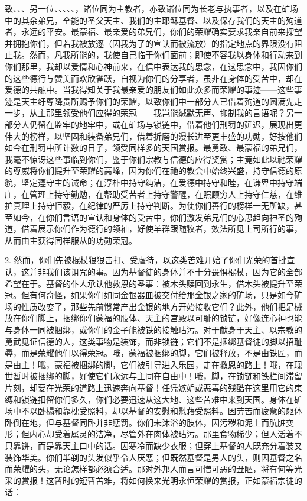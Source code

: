 致、、、另一位、、、、、，诸位同为主教者，亦致诸位同为长老与执事者，以及在矿场中的其余弟兄，全能的圣父天主、我们的主耶稣基督、以及保存我们的天主的殉道者，永远的平安。最蒙福、最亲爱的弟兄们，你们的荣耀确实要求我亲自前来探望并拥抱你们，但若我被放逐（因我为了的宣认而被流放）的指定地点的界限没有阻止我。然而，凡我所能的，我使自己临于你们面前；即使不容我以身体和行动来到你们那里，我却以爱情和心神前来，在信中表达我的思念，在这思念中，我因你们的这些德行与赞美而欢欣雀跃，自视为你们的分享者，虽非在身体的受苦中，却在爱德的共融中。当我得知关于我最亲爱的朋友们如此众多而荣耀的事迹——这些事迹是天主纡尊降贵所赐予你们的荣耀，以致你们中一部分人已借着殉道的圆满先走一步，从主那里领受他们应得的荣冠——我岂能缄默无声、抑制我的言语呢？另一部分人仍留在监牢的地牢中，或在矿场与锁链中，借着他们刑罚的延迟，展现出更伟大的榜样，以坚固和装备弟兄们，借着折磨的漫长进至更丰盛的功勋，好按他们如今在刑罚中所计数的日子，领受同样多的天国赏报。最勇敢、最蒙福的弟兄们，我毫不惊讶这些事临到你们，鉴于你们宗教与信德的应得奖赏；主竟如此以祂荣耀的尊威将你们提升至荣耀的高峰，因为你们在祂的教会中始终兴盛，持守信德的原貌，坚定遵守主的诫命；在淳朴中持守纯洁，在爱德中持守和睦，在谦卑中持守端庄，在管理上持守勤勉，在帮助受苦者上持守警醒，在照顾穷人上持守仁慈，在维护真理上持守恒毅，在纪律的严厉上持守判断。为使你们善行的榜样一无所缺，甚至如今，在你们言语的宣认和身体的受苦中，你们激发弟兄们的心思趋向神圣的殉道，借着展示你们作为德行的领袖，好使羊群跟随牧者，效法所见上司所行的事，从而由主获得同样服从的功勋荣冠。\par

2. 然而，你们先被棍杖狠狠击打、受虐待，以这类苦难开始了你们光荣的首批宣认，这并非我们该诅咒的事。因为基督徒的身体并不十分畏惧棍杖，因为它的全部希望在于。基督的仆人承认他救恩的圣事：被木头赎回到永生，借木头被提升至荣冠。但有何奇怪，如果你们如同金银器皿被交付给那金银之家的矿场，只是如今矿场的性质改变了，那些先前惯常产出金银的地方开始接收它们？此外，他们把足械放在你们脚上，捆绑你们蒙福的肢体、天主的宫殿以可耻的锁链，好像连心神也能与身体一同被捆绑，或你们的金子能被铁的接触玷污。对于献身于天主、以宗教的勇武见证信德的人，这类事物是装饰，而非锁链；它们不是捆绑基督徒的脚以招耻辱，而是荣耀他们以得荣冠。哦，蒙福被捆绑的脚，它们被释放，不是由铁匠，而是由主！哦，蒙福被捆绑的脚，它们被引导进入乐园，走在救恩的路上！哦，在现世暂时被捆绑的脚，好使它们永远与主同在自由中！哦，脚，在锁链和铁栏间滞留片刻，却要在光荣的道路上迅速奔向基督！任凭嫉妒或恶毒的残酷在这里用它的束缚和锁链扣留你们多久，你们必要迅速从这大地、这些苦难中来到天国。身体在矿场中不以卧榻和靠枕受照料，却以基督的安慰和慰藉受照料。因劳苦而疲惫的躯体卧倒在地，但与基督同卧并非惩罚。你们未沐浴的肢体，因污秽和泥土而肮脏变形；但内心却受着属灵的洁净，尽管外在肉体被玷污。那里食物稀少；但人活着不只靠饼，而是靠天主口中的话。因寒冷而缺少衣服；但穿上基督的人既充分着装又装饰华美。你们半剃的头发似乎令人厌恶；但既然基督是男人的头，则因基督之名而荣耀的头，无论怎样都必须合适。那对外邦人而言可憎可恶的丑陋，将有何等光采的赏报！这暂时的短暂苦难，将如何换来光明永恒荣耀的赏报，正如蒙福宗徒的话：\par

